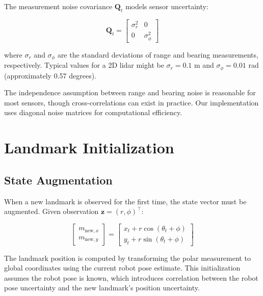 \documentclass[12pt,a4paper]{article}
\newcommand{\measurement}{\bm{z}}
\newcommand{\noise}{\bm{Q}}
\begin{document}
The measurement noise covariance $\noise_t$ models sensor uncertainty:

\begin{equation}
    \noise_t = \begin{bmatrix}
        \sigma_r^2 & 0 \\
        0 & \sigma_\phi^2
    \end{bmatrix}
\end{equation}

where $\sigma_r$ and $\sigma_\phi$ are the standard deviations of range and bearing measurements, respectively. Typical values for a 2D lidar might be $\sigma_r = 0.1$ m and $\sigma_\phi = 0.01$ rad (approximately 0.57 degrees).

The independence assumption between range and bearing noise is reasonable for most sensors, though cross-correlations can exist in practice. Our implementation uses diagonal noise matrices for computational efficiency.

\section{Landmark Initialization}

\subsection{State Augmentation}

When a new landmark is observed for the first time, the state vector must be augmented. Given observation $\measurement = (r, \phi)^\top$:

\begin{equation}
    \begin{bmatrix}
        m_{\text{new},x} \\
        m_{\text{new},y}
    \end{bmatrix} = \begin{bmatrix}
        x_t + r \cos(\theta_t + \phi) \\
        y_t + r \sin(\theta_t + \phi)
    \end{bmatrix}
    \label{eq:landmark_init}
\end{equation}

The landmark position is computed by transforming the polar measurement to global coordinates using the current robot pose estimate. This initialization assumes the robot pose is known, which introduces correlation between the robot pose uncertainty and the new landmark's position uncertainty.
\end{document}
